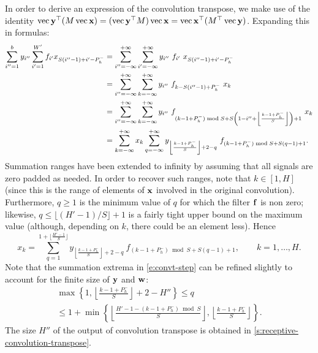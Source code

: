 In order to derive an expression of the convolution transpose,  we make use of the identity $\operatorname{vec} \mathbf{y}^\top (M \operatorname{vec} \mathbf{x}) = (\operatorname{vec} \mathbf{y}^\top M) \operatorname{vec}\mathbf{x} = \operatorname{vec}\mathbf{x}^\top (M^\top \operatorname{vec}\mathbf{y})$. Expanding this in formulas:
\begin{align*}
\sum_{i''=1}^b y_{i''} 
\sum_{i'=1}^{W'} f_{i'} x_{S (i''-1) + i'  -P_h^-}
&=
\sum_{i''=-\infty}^{+\infty}
\sum_{i'=-\infty}^{+\infty} 
y_{i''}\ f_{i'}\ x_{S (i''-1) + i'  -P_h^-}
\\
&=
\sum_{i''=-\infty}^{+\infty}
\sum_{k=-\infty}^{+\infty} 
y_{i''}\ f_{k-S(i'' -1) + P_h^-}\ x_{k}
\\
&=
\sum_{i''=-\infty}^{+\infty}
\sum_{k=-\infty}^{+\infty} 
y_{i''}%
\ %
f_{%
	(k-1+ P_h^-) \bmod S +
	S \left(1 -i''  + \left\lfloor \frac{k-1+ P_h^-}{S} \right\rfloor\right)+1
}\ x_{k}
\\
&=
\sum_{k=-\infty}^{+\infty} 
x_{k}
\sum_{q=-\infty}^{+\infty}
y_{\left\lfloor \frac{k-1+ P_h^-}{S} \right\rfloor + 2 - q}
\ %
f_{(k-1+ P_h^-)\bmod S +S(q - 1)+1}.
\end{align*}
Summation ranges have been extended to infinity by assuming that all signals are zero padded as needed. In order to recover such ranges, note that $k \in [1,H]$ (since this is the range of elements of $\mathbf{x}$ involved in the original convolution). Furthermore, $q\geq 1$ is the minimum value of $q$ for which the filter $\mathbf{f}$ is non zero; likewise, $q\leq \lfloor (H'-1)/S\rfloor +1$ is a fairly tight upper bound on the maximum value (although, depending on $k$, there could be an element less). Hence
\begin{equation}\label{e:convt-step}
x_k = 
\sum_{q=1}^{1 + \lfloor \frac{H'-1}{S} \rfloor}
y_{\left\lfloor \frac{k-1+ P_h^-}{S} \right\rfloor + 2 - q}\ %
f_{(k-1+ P_h^-)\bmod S +S(q - 1)+1},
\qquad k=1,\dots, H.
\end{equation}
Note that the summation extrema in \eqref{e:convt-step} can be refined slightly to account for the finite size of $\mathbf{y}$ and $\mathbf{w}$:
\begin{multline*}
\max\left\{
1, 
\left\lfloor \frac{k-1 + P_h^-}{S} \right\rfloor + 2 - H''
\right\}
\leq q \\
\leq
1 +\min\left\{
\left\lfloor \frac{H'-1-(k-1+ P_h^-)\bmod S}{S} \right\rfloor, 
\left\lfloor \frac{k-1 + P_h^-}{S} \right\rfloor
\right\}.
\end{multline*}
The size $H''$ of the output of convolution transpose is obtained in \cref{s:receptive-convolution-transpose}.

